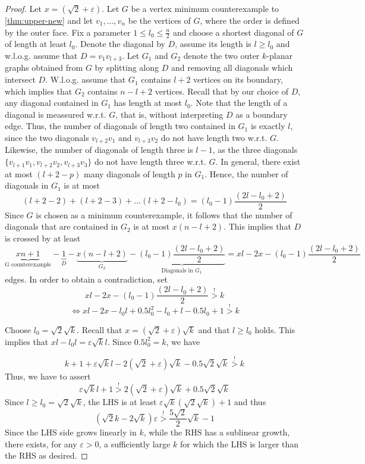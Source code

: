 \documentclass[nolineno,a4paper,USenglish,cleveref,autoref,thm-restate]
{socg}
\begin{document}
\begin{proof}
Let $x = (\sqrt{2}+\varepsilon)$.
Let $G$ be a vertex minimum counterexample to \cref{thm:upper-new} and let $v_1,\dots,v_n$ be the vertices of $G$, where the order is defined by the outer face. Fix a parameter $1 \leq l_0 \leq \frac{n}{2}$ and choose a shortest diagonal of $G$ of length at least $l_0$. Denote the diagonal by $D$, assume its length is $l \geq l_0$ and w.l.o.g. assume that $D = v_1v_{l+3}$. Let $G_1$ and $G_2$ denote the two outer $k$-planar graphs obtained from $G$ by splitting along $D$ and removing all diagonals which intersect $D$. W.l.o.g. assume that $G_1$ contains $l+2$ vertices on its boundary, which implies that $G_2$ contains $n-l+2$ vertices.
Recall that by our choice of $D$, any diagonal contained in $G_1$ has length at most $l_0$.
Note that the length of a diagonal is meassured w.r.t. $G$, that is, without interpreting $D$ as a boundary edge. Thus, the number of diagonals of length two contained in $G_1$ is exactly $l$, since the two diagonals $v_{l+2}v_1$ and $v_{l+3}v_2$ do not have length two w.r.t. $G$. 
Likewise, the number of diagonals of length three is $l-1$, as the three diagonals $\{v_{l+1}v_1,v_{l+2}v_2,v_{l+3}v_3\}$ do not have length three w.r.t. $G$. In general, there exist at most $(l+2-p)$ many diagonals of length $p$ in $G_1$.
Hence, the number of diagonals in $G_1$ is at most
\[(l+2-2)+(l+2-3)+\dots(l+2-l_0) = (l_0-1)\frac{(2l-l_0+2)}{2}\]
Since $G$ is chosen as a minimum counterexample, it follows that the number of diagonals that are contained in $G_2$ is at most $x(n-l+2)$.
This implies that $D$ is crossed by at least
\[\underbrace{xn+1}_{\text{G counterexample}} -\underbrace{1}_D - \underbrace{x(n-l+2)}_{G_2} - \underbrace{(l_0-1)\frac{(2l-l_0+2)}{2}}_{\text{Diagonals in }G_1} = xl-2x - (l_0-1)\frac{(2l-l_0+2)}{2} \] edges.
In order to obtain a contradiction, set
\[xl-2x - (l_0-1)\frac{(2l-l_0+2)}{2} \stackrel{!}{>} k\]
\[\Leftrightarrow xl-2x-l_0l+0.5l_0^2-l_0+l-0.5l_0+1 \stackrel{!}{>}k\]

Choose $l_0 = \sqrt{2}\sqrt{k}$. Recall that $x = (\sqrt{2}+\varepsilon)\sqrt{k}$ and that $l \geq l_0$ holds. 
This implies that $xl-l_0l = \varepsilon\sqrt{k}l$. Since $0.5l_0^2 = k$, we have

\[k + 1 + \varepsilon\sqrt{k}l -2(\sqrt{2}+\varepsilon)\sqrt{k} -0.5\sqrt{2}\sqrt{k} \stackrel{!}{>}k \]
Thus, we have to assert
\[\varepsilon\sqrt{k}l + 1 \stackrel{!}{>} 2(\sqrt{2}+\varepsilon)\sqrt{k} +0.5\sqrt{2}\sqrt{k}\]
Since $l \geq l_0 = \sqrt{2}\sqrt{k}$, the LHS is at least $\varepsilon\sqrt{k}(\sqrt{2}\sqrt{k})+1$ and thus
\[(\sqrt{2}k-2\sqrt{k})\varepsilon \stackrel{!}{>}\frac{5\sqrt{2}}{2}\sqrt{k}-1 \]
Since the LHS side grows linearly in $k$, while the RHS has a sublinear growth, there exists, for any $\varepsilon > 0$, a sufficiently large $k$ for which the LHS is larger than the RHS as desired.
\end{proof}
\end{document}
